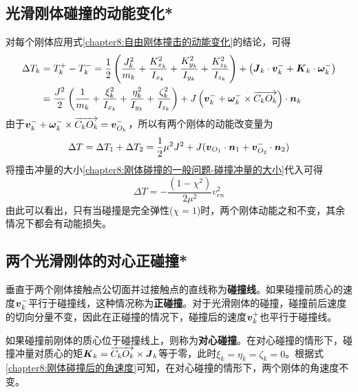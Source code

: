 \subsection{光滑刚体碰撞的动能变化*}

对每个刚体应用式\eqref{chapter8:自由刚体撞击的动能变化}的结论，可得
\begin{align*}
	\Delta T_k & = T_k^+-T_k^- = \frac12 \left(\frac{J_k^2}{m_k} + \frac{K_{x_k}^2}{I_{x_k}} + \frac{K_{y_k}^2}{I_{y_k}} + \frac{K_{z_k}^2}{I_{z_k}}\right) + \left(\boldsymbol{J}_k\cdot \boldsymbol{v}_k^-+\boldsymbol{K}_k\cdot \boldsymbol{\omega}_k^-\right) \\
	& = \frac{J^2}{2}\left(\frac{1}{m_k} + \frac{\xi_k^2}{I_{x_k}} + \frac{\eta_k^2}{I_{y_k}} + \frac{\zeta_k^2}{I_{z_k}}\right) + J\left(\boldsymbol{v}_k^-+\boldsymbol{\omega}_k^-\times \overrightarrow{C_kO_k}\right) \cdot \boldsymbol{n}_k
\end{align*}
由于$\boldsymbol{v}_k^-+\boldsymbol{\omega}_k^-\times \overrightarrow{C_kO_k} = \boldsymbol{v}_{O_k}^-$，所以有两个刚体的动能改变量为
\begin{equation*}
	\Delta T = \Delta T_1+\Delta T_2 = \frac12 \mu^2J^2+J(\boldsymbol{v}_{O_1}\cdot \boldsymbol{n}_1 + \boldsymbol{v}_{O_2}^-\cdot \boldsymbol{n}_2)
\end{equation*}
将撞击冲量的大小\eqref{chapter8:刚体碰撞的一般问题-碰撞冲量的大小}代入可得
\begin{equation}
	\Delta T = -\frac{(1-\chi^2)}{2\mu^2}v_{rn}^2
	\label{chapter8:光滑刚体碰撞的动能变化式}
\end{equation}
由此可以看出，只有当碰撞是完全弹性($\chi=1$)时，两个刚体动能之和不变，其余情况下都会有动能损失。

\subsection{两个光滑刚体的对心正碰撞*}

垂直于两个刚体接触点公切面并过接触点的直线称为{\bf 碰撞线}。如果碰撞前质心的速度$\boldsymbol{v}_k^-$平行于碰撞线，这种情况称为{\bf 正碰撞}。对于光滑刚体的碰撞，碰撞前后速度的切向分量不变，因此在正碰撞的情况下，碰撞后的速度$\boldsymbol{v}_k^+$也平行于碰撞线。

如果碰撞前刚体的质心位于碰撞线上，则称为{\bf 对心碰撞}。在对心碰撞的情形下，碰撞冲量对质心的矩$\boldsymbol{K}_k=\overrightarrow{C_kO_k}\times \boldsymbol{J}_k$等于零，此时$\xi_k=\eta_k=\zeta_k=0$。根据式\eqref{chapter8:刚体碰撞后的角速度}可知，在对心碰撞的情形下，两个刚体的角速度不变。

